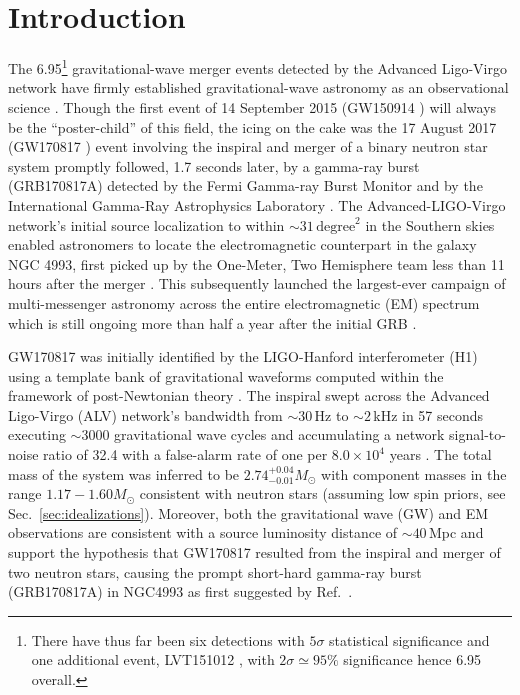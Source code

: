 \documentclass[prd,amsmath,amssymb,aps,floats,amsfonts,notitlepage,superscriptaddress,eqsecnum,nofootinbib,10pt]{revtex4-1}
\begin{document}
\section{Introduction}\label{Sec:Intro}
The 6.95\footnote{There have thus far been six detections with $5\sigma$ statistical significance and one additional event, LVT151012 \cite{TheLIGOScientific:2016pea}, with $2\sigma \simeq 95\%$ significance hence 6.95 overall.} 
gravitational-wave merger events detected by the Advanced Ligo-Virgo network have firmly established gravitational-wave astronomy
as an observational science \cite{TheLIGOScientific:2016pea, Abbott:2017gyy, Abbott:2017oio, Abbott:2017vtc, GW170817}. 
Though the first event of 14 September 2015 (GW150914 \cite{GW150914}) will always be the ``poster-child'' of this field,
the icing on the cake was the 17 August 2017 (GW170817 \cite{GW170817}) event involving the inspiral and merger of a binary neutron star system 
promptly followed, 1.7 seconds later, by a gamma-ray burst (GRB170817A) detected by the Fermi Gamma-ray Burst Monitor \cite{Fermi} and by the International Gamma-Ray Astrophysics Laboratory \cite{Svinkin, Savchenko:2017ffs}.
The Advanced-LIGO-Virgo network's initial source localization to within $\sim 31\,\text{degree}^2$ in the Southern skies
enabled astronomers to locate the electromagnetic counterpart in the galaxy NGC 4993, 
first picked up by the One-Meter, Two Hemisphere team less than 11 hours after the merger \cite{Coulter2017, Coulter:2017wya}.
This subsequently launched the largest-ever campaign of multi-messenger astronomy across the entire electromagnetic (EM) spectrum which is still ongoing
more than half a year after the initial GRB \cite{GBM:2017lvd}. 

GW170817 was initially identified by the LIGO-Hanford interferometer (H1) 
using a template bank of gravitational waveforms computed within the framework of post-Newtonian theory \cite{Buonanno:2009zt, Blanchet_LRR}.
The inspiral swept across the Advanced Ligo-Virgo (ALV) network's bandwidth from $\sim 30\,$Hz to $\sim 2\,$kHz in 57 seconds
executing $\sim 3000$ gravitational wave cycles and accumulating a network signal-to-noise ratio of 32.4 with a false-alarm rate of one per $8.0\times 10^4$ years \cite{GW170817}. 
The total mass of the system was inferred to be $2.74^{+0.04}_{-0.01} M_\odot$ with component masses in the range $1.17-1.60 M_\odot$ consistent
with neutron stars (assuming low spin priors, see Sec.~\ref{sec:idealizations}).
Moreover, both the gravitational wave (GW) and EM observations are consistent with a source luminosity distance of $\sim 40\,$Mpc
and support the hypothesis that GW170817 resulted from the inspiral and merger of two neutron stars, 
causing the prompt short-hard gamma-ray burst (GRB170817A) in NGC4993 as first suggested by Ref.~\cite{Eichler:1989ve}. 
\end{document}
